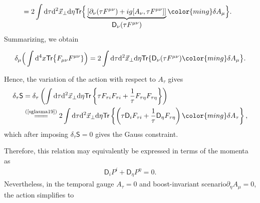\begin{note}
\begin{align*}
    &=2\int\mathrm{d}\tau\mathrm{d}^2\vec{x}_\perp\mathrm{d}\eta\textsf{Tr}\Big\{\underbrace{[\partial_\nu(\tau F^{\mu\nu})+ig[A_\nu,\tau F^{\mu\nu}]]}_{\textstyle\textsf{D}_\nu (\tau F^{\mu\nu})}{\color{ming}\delta A_\mu}\Big\}.
\end{align*}
Summarizing, we obtain
\begin{fullwidth}
\begin{align}\label{sglasma19}
    \delta_\mu\Big(\int\mathrm{d}^4x\textsf{Tr}\big\{F_{\mu\nu}F^{\mu\nu}\}\Big)=2\int\mathrm{d}\tau\mathrm{d}^2\vec{x}_\perp\mathrm{d}\eta\textsf{Tr}\{\textstyle\textsf{D}_\nu (\tau F^{\mu\nu}){\color{ming}\delta A_\mu}\big\}.
\end{align}
\end{fullwidth}


Hence, the variation of the action with respect to $A_\tau$ gives
\begin{align*}
    \delta_\tau\textsf{S}&=\delta_\tau\left(\int\mathrm{d}\tau\mathrm{d}^2\vec{x}_\perp\mathrm{d}\eta\textsf{Tr}\left\{\tau F_{\tau i}F_{\tau i}+\frac{1}{\tau}F_{\tau\eta}F_{\tau\eta}\right\}\right)\\
    &\stackrel{(\text{\cref{sglasma19}})}{=\joinrel=\joinrel=}2\int\mathrm{d}\tau\mathrm{d}^2\vec{x}_\perp\mathrm{d}\eta\textsf{Tr}\left\{\left(\tau\textsf{D}_iF_{\tau i}+\frac{1}{\tau}\textsf{D}_\eta F_{\tau\eta}\right){\color{ming}\delta A_\tau}\right\},
\end{align*}
which after imposing $\delta_\tau\textsf{S}=0$ gives the Gauss constraint.
\end{note}

Therefore, this relation may equivalently be expressed in terms of the momenta as
\begin{align}\label{sglasma23}
    \textsf{D}_i P^i+\textsf{D}_\eta P^\eta=0.
\end{align}
Nevertheless, in the temporal gauge $A_\tau=0$ and boost-invariant scenario$\partial_\eta A_\mu=0$, the action simplifies to

\vspace{0.5cm}

\begin{fullwidth}
\end{fullwidth}

